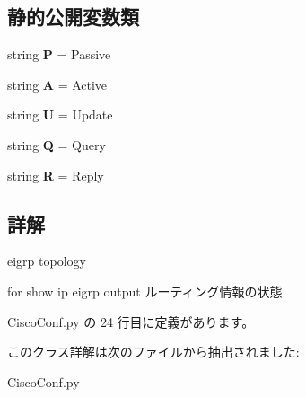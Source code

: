 \subsection*{静的公開変数類}
\begin{DoxyCompactItemize}
\item 
\mbox{\label{classCiscoConf_1_1eEigrpCode_a65d3b0bfcea421ea718b4f7c7e0cefe9}} 
string {\bfseries P} = \textquotesingle{}Passive\textquotesingle{}
\item 
\mbox{\label{classCiscoConf_1_1eEigrpCode_abce26088a2c90432c7520bfbe8c41c9a}} 
string {\bfseries A} = \textquotesingle{}Active\textquotesingle{}
\item 
\mbox{\label{classCiscoConf_1_1eEigrpCode_ad12ab35eb8e834c48726550a5994234f}} 
string {\bfseries U} = \textquotesingle{}Update\textquotesingle{}
\item 
\mbox{\label{classCiscoConf_1_1eEigrpCode_a9dccbf14882cce5e3373681f4eeb84bd}} 
string {\bfseries Q} = \textquotesingle{}Query\textquotesingle{}
\item 
\mbox{\label{classCiscoConf_1_1eEigrpCode_a563a6e111f811aa07296ccb8c7dbe479}} 
string {\bfseries R} = \textquotesingle{}Reply\textquotesingle{}
\end{DoxyCompactItemize}


\subsection{詳解}
eigrp topology 

\begin{DoxyVerb}for show ip eigrp output
ルーティング情報の状態
\end{DoxyVerb}
 

 Cisco\+Conf.\+py の 24 行目に定義があります。



このクラス詳解は次のファイルから抽出されました\+:\begin{DoxyCompactItemize}
\item 
Cisco\+Conf.\+py\end{DoxyCompactItemize}
